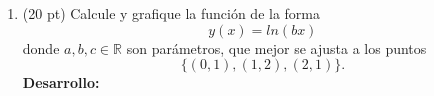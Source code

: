 \documentclass[11pt]{article}
\begin{document}
\begin{enumerate}
\newpage 
\item  (20 pt)
Calcule y grafique la funci\'on de la forma
$$
y(x)=ln(bx)
$$
donde $a,b,c\in\mathbb{R}$ son par\'ametros, que mejor se ajusta a los puntos
$$
\{(0,1),(1,2),(2,1)\}.
$$
\textbf{Desarrollo:}



\end{enumerate}
\end{document}
